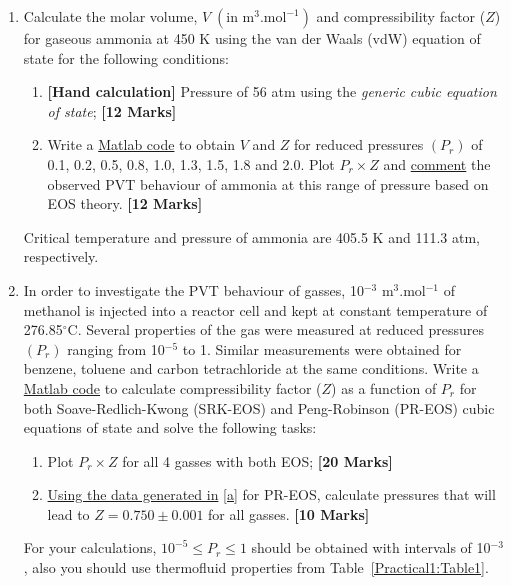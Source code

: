 \documentclass[12pts,a4paper,amsmath,amssymb,floatfix]{article}%
\renewcommand\leq{\leqslant}
\begin{document}
\begin{enumerate}[label=\bfseries Problem \arabic*:]
%
     \item\label{Prob1} Calculate the molar volume, $V\;\left(\text{in m}^{3}\text{.mol}^{-1}\right)$ and compressibility factor ($Z$) for gaseous ammonia at 450 K using the van der Waals (vdW) equation of state for the following conditions:
          \begin{enumerate}[label=\bfseries Task \arabic*]
              \item\label{c} {\bf[Hand calculation]} Pressure of 56 atm using the {\it generic cubic equation of state}; \hfill{\bf[12 Marks]}
              \item\label{d} Write a \underline{Matlab code} to obtain $V$ and $Z$ for reduced pressures $\left(P_{r}\right)$ of 0.1, 0.2, 0.5, 0.8, 1.0, 1.3, 1.5, 1.8 and 2.0. Plot $P_{r}\times Z$ and \underline{comment} the observed PVT behaviour of ammonia at this range of pressure based on EOS theory. \hfill{\bf[12 Marks]}
          \end{enumerate}
          Critical temperature and pressure of ammonia are 405.5 K and 111.3 atm, respectively.

     \item\label{Prob2} In order to investigate the PVT behaviour of gasses, 10$^{-3}$ m$^{3}$.mol$^{-1}$ of methanol is injected into a reactor cell and kept at constant temperature of 276.85$^{\circ}$C. Several properties of the gas were measured at reduced pressures $\left(P_{r}\right)$ ranging from 10$^{-5}$ to 1.  Similar measurements were obtained for benzene, toluene and carbon tetrachloride at the same conditions. Write a \underline{Matlab code} to calculate compressibility factor ($Z$) as a function of $P_{r}$ for both Soave-Redlich-Kwong (SRK-EOS) and Peng-Robinson (PR-EOS) cubic equations of state and solve the following tasks:
          \begin{enumerate}[label=\bfseries Task \arabic*]
              \item\label{a} Plot $P_{r}\times Z$ for all 4 gasses with both EOS; \hfill{\bf[20 Marks]} 
              \item\label{b} \underline{Using the data generated in} \ref{a} for PR-EOS, calculate pressures that will lead to $Z=0.750\pm0.001$ for all gasses. \hfill{\bf[10 Marks]} 
          \end{enumerate}
For your calculations, $10^{-5}\leq P_{r}\leq 1$ should be obtained with intervals of 10$^{-3}$, also you should use thermofluid properties from Table~\ref{Practical1:Table1}. 


\end{enumerate}
\end{document}

